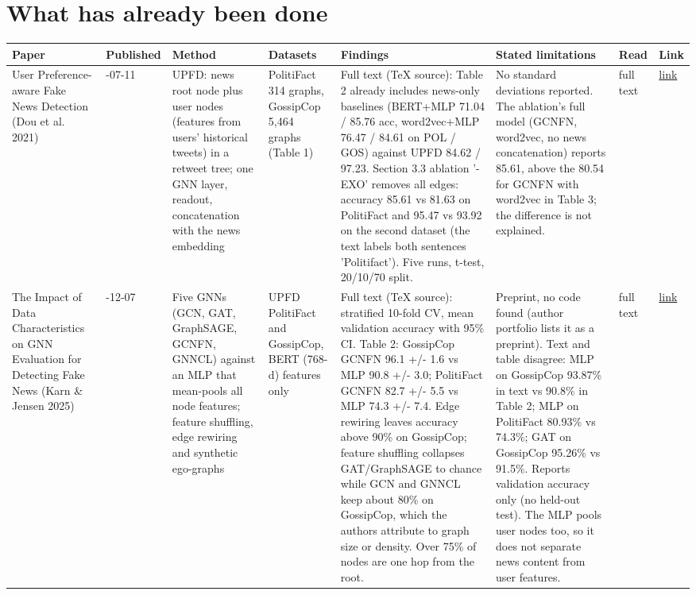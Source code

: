 \documentclass[11pt,a4paper]{article}
\begin{document}
\section{What has already been done}

{\small
\begin{longtable}{>{\raggedright\arraybackslash}p{}>{\raggedright\arraybackslash}p{}>{\raggedright\arraybackslash}p{}>{\raggedright\arraybackslash}p{}>{\raggedright\arraybackslash}p{}>{\raggedright\arraybackslash}p{}>{\raggedright\arraybackslash}p{}>{\raggedright\arraybackslash}p{}}
\toprule
\textbf{Paper} & \textbf{Published} & \textbf{Method} & \textbf{Datasets} & \textbf{Findings} & \textbf{Stated limitations} & \textbf{Read} & \textbf{Link} \\
\midrule
\endhead
User Preference-aware Fake News Detection (Dou et al. 2021) & 2021-07-11 & UPFD: news root node plus user nodes (features from users' historical tweets) in a retweet tree; one GNN layer, readout, concatenation with the news embedding & PolitiFact 314 graphs, GossipCop 5,464 graphs (Table 1) & Full text (TeX source): Table 2 already includes news-only baselines (BERT+MLP 71.04 / 85.76 acc, word2vec+MLP 76.47 / 84.61 on POL / GOS) against UPFD 84.62 / 97.23. Section 3.3 ablation '-EXO' removes all edges: accuracy 85.61 vs 81.63 on PolitiFact and 95.47 vs 93.92 on the second dataset (the text labels both sentences 'Politifact'). Five runs, t-test, 20/10/70 split. & No standard deviations reported. The ablation's full model (GCNFN, word2vec, no news concatenation) reports 85.61, above the 80.54 for GCNFN with word2vec in Table 3; the difference is not explained. & full text & \href{https://doi.org/10.1145/3404835.3462990}{link} \\
The Impact of Data Characteristics on GNN Evaluation for Detecting Fake News (Karn \& Jensen 2025) & 2025-12-07 & Five GNNs (GCN, GAT, GraphSAGE, GCNFN, GNNCL) against an MLP that mean-pools all node features; feature shuffling, edge rewiring and synthetic ego-graphs & UPFD PolitiFact and GossipCop, BERT (768-d) features only & Full text (TeX source): stratified 10-fold CV, mean validation accuracy with 95\% CI. Table 2: GossipCop GCNFN 96.1 +/- 1.6 vs MLP 90.8 +/- 3.0; PolitiFact GCNFN 82.7 +/- 5.5 vs MLP 74.3 +/- 7.4. Edge rewiring leaves accuracy above 90\% on GossipCop; feature shuffling collapses GAT/GraphSAGE to chance while GCN and GNNCL keep about 80\% on GossipCop, which the authors attribute to graph size or density. Over 75\% of nodes are one hop from the root. & Preprint, no code found (author portfolio lists it as a preprint). Text and table disagree: MLP on GossipCop 93.87\% in text vs 90.8\% in Table 2; MLP on PolitiFact 80.93\% vs 74.3\%; GAT on GossipCop 95.26\% vs 91.5\%. Reports validation accuracy only (no held-out test). The MLP pools user nodes too, so it does not separate news content from user features. & full text & \href{https://arxiv.org/abs/2512.06638}{link} \\

\end{longtable}}
\end{document}
